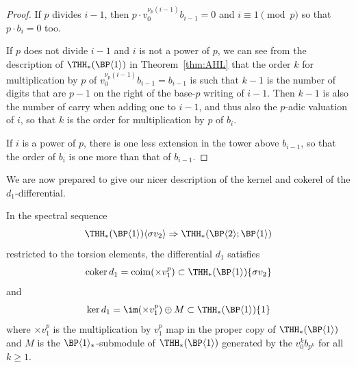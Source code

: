 \begin{proof}
  If $p$ divides $i - 1$, then $p \cdot v_0^{\nu_p(i-1)} b_{i-1} = 0$ and $i \equiv 1 \pmod{p}$ so that $p \cdot b_i = 0$ too.

  If $p$ does not divide $i-1$ and $i$ is not a power of $p$, we can see from the description of $\THH_*(\BP\langle 1\rangle)$ in Theorem~\ref{thm:AHL} that the order $k$ for multiplication by $p$ of $v_0^{\nu_p(i-1)} b_{i-1} = b_{i -1}$ is such that $k -1$ is the number of digits that are $p - 1$ on the right of the base-$p$ writing of $i - 1$. Then $k-1$ is also the number of carry when adding one to $i -1$, and thus also the $p$-adic valuation of $i$, so that $k$ is the order for multiplication by $p$ of $b_i$.

  If $i$ is a power of $p$, there is one less extension in the tower above $b_{i-1}$, so that the order of $b_i$ is one more than that of $b_{i-1}$.
\end{proof}
We are now prepared to give our nicer description of the kernel and cokerel of the $d_1$-differential. 
\begin{proposition} \label{prop:specseqtorsion}
  In the spectral sequence
  \begin{equation}
    \THH_*(\BP\langle 1\rangle) \langle \sigma v_2 \rangle \Rightarrow \THH_*(\BP \langle 2 \rangle; \BP\langle 1\rangle)
  \end{equation}
  restricted to the torsion elements, the differential $d_1$ satisfies
  \begin{equation}
    \operatorname{coker} d_1 = \operatorname{coim}(\times v_1^p) \subset \THH_*(\BP\langle 1\rangle)\{ \sigma v_2 \}
  \end{equation}
  and
  \begin{equation}
    \ker d_1 =  \im (\times v_1^p) \oplus M \subset \THH_*(\BP\langle 1\rangle)\{ 1 \}
  \end{equation}
  where $\times v_1^p$ is the multiplication by $v_1^p$ map in the proper copy of $\THH_*(\BP\langle 1\rangle)$ and $M$ is the $\BP\langle 1\rangle_*$-submodule of $\THH_*(\BP\langle 1\rangle)$ generated by the $v_0^{k}b_{p^k}$ for all $k \geq 1$.
\end{proposition}

